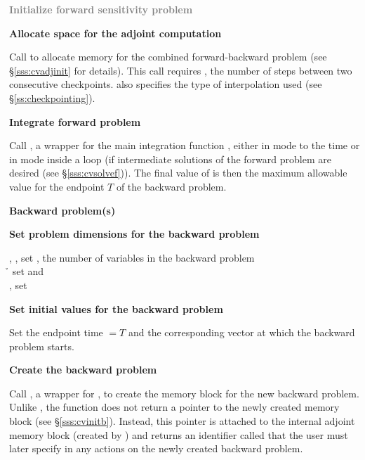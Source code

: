 \begin{Steps}
\item
  \textcolor{gray}{\bf Initialize forward sensitivity problem}

\item
  {\bf Allocate space for the adjoint computation}

  Call \id{()} to allocate memory for the 
  combined forward-backward problem (see \S\ref{sss:cvadjinit} for details).
  This call requires , the number of steps between two consecutive checkpoints.
   also specifies the type of interpolation used 
  (see \S\ref{ss:checkpointing}).

\item
  {\bf Integrate forward problem}

  Call , a wrapper for the {\cvodes} main integration
  function , either in  mode to the time 
   or in  mode inside a loop (if intermediate
  solutions of the forward problem are desired (see \S\ref{sss:cvsolvef})).
  The final value of  is then the maximum allowable value for the
  endpoint $T$ of the backward problem.

  \vspace{0.2in}\centerline{\bf Backward problem(s)}

 \item \label{i:back_start}
   {\bf Set problem dimensions for the backward problem}
   
   {\s, \omp, \pt} set , the number of variables in the backward problem \\
   {\p} {\h} set  and  \\
   {\omp, \pt} set 

\item
  {\bf Set initial values for the backward problem}

  Set the endpoint time  $= T$ and the corresponding vector 
  at which the backward problem starts.

\item
  {\bf Create the backward problem}

  Call , a wrapper for , to
  create the {\cvodes} memory block for the new backward problem. Unlike
  , the function  does not return a pointer to
  the newly created memory block (see \S\ref{sss:cvinitb}). Instead, this pointer
  is attached to the internal adjoint memory  block (created by )
  and returns an identifier called  that the user must later specify
  in any actions on the newly created backward problem.


\end{Steps}
